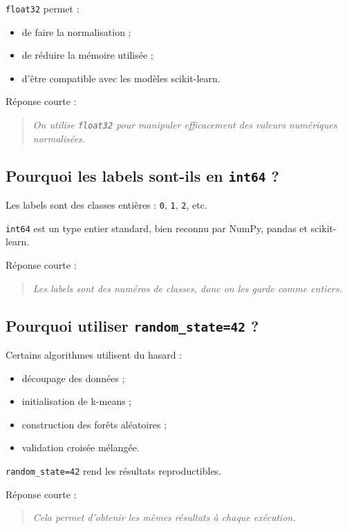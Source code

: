 \documentclass[11pt,a4paper]{article}
\begin{document}
\texttt{float32} permet :

\begin{itemize}
\item de faire la normalisation ;
\item de réduire la mémoire utilisée ;
\item d'être compatible avec les modèles scikit-learn.
\end{itemize}

Réponse courte :

\begin{quote}
\itshape On utilise \texttt{float32} pour manipuler efficacement des valeurs numériques normalisées.
\end{quote}

\subsection{Pourquoi les labels sont-ils en \texttt{int64} ?}

Les labels sont des classes entières : \texttt{0}, \texttt{1}, \texttt{2}, etc.

\texttt{int64} est un type entier standard, bien reconnu par NumPy, pandas et scikit-learn.

Réponse courte :

\begin{quote}
\itshape Les labels sont des numéros de classes, donc on les garde comme entiers.
\end{quote}

\subsection{Pourquoi utiliser \texttt{random\_state=42} ?}

Certains algorithmes utilisent du hasard :

\begin{itemize}
\item découpage des données ;
\item initialisation de k-means ;
\item construction des forêts aléatoires ;
\item validation croisée mélangée.
\end{itemize}

\texttt{random\_state=42} rend les résultats reproductibles.

Réponse courte :

\begin{quote}
\itshape Cela permet d'obtenir les mêmes résultats à chaque exécution.
\end{quote}
\end{document}
